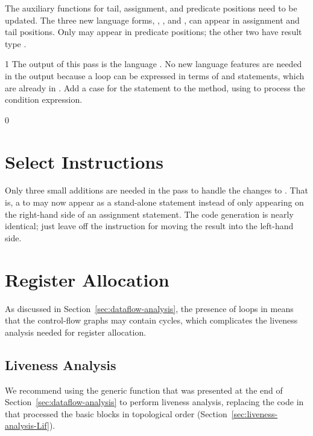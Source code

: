 \documentclass[7x10]{TimesAPriori_MIT}%
\def\racketEd{0}
\def\pythonEd{1}
\def\edition{1}
\begin{document}
{The auxiliary functions for tail, assignment, and predicate positions
need to be updated. The three new language forms, ,
, and , can appear in assignment and tail
positions.  Only  may appear in predicate positions; the
other two have result type .

\fi}
%
{\if\edition\pythonEd
%
The output of this pass is the language \LangCIf{}. No new language
features are needed in the output because a  loop can be
expressed in terms of  and  statements, which are
already in \LangCIf{}.
%  
Add a case for the  statement to the
 method, using  to process
the condition expression.
%
\fi}

{\if\edition\racketEd
  
\section{Select Instructions}
\label{sec:select-instructions-loop}

Only three small additions are needed in the
 pass to handle the changes to
\LangCLoop{}.  That is, a  to  may now appear as a
stand-alone statement instead of only appearing on the right-hand
side of an assignment statement. The code generation is nearly
identical; just leave off the instruction for moving the result into
the left-hand side.

\fi}

\section{Register Allocation}
\label{sec:register-allocation-loop}

As discussed in Section~\ref{sec:dataflow-analysis}, the presence of
loops in \LangLoop{} means that the control-flow graphs may contain cycles,
which complicates the liveness analysis needed for register
allocation.

\subsection{Liveness Analysis}
\label{sec:liveness-analysis-r8}

We recommend using the generic  function that
was presented at the end of Section~\ref{sec:dataflow-analysis} to
perform liveness analysis, replacing the code in
 that processed the basic blocks in topological
order (Section~\ref{sec:liveness-analysis-Lif}).
\end{document}
